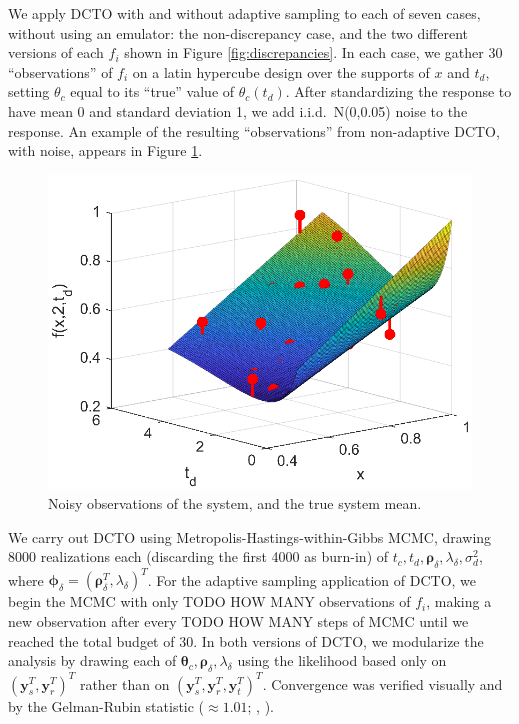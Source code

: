 \documentclass[12pt]{article}
\begin{document}
%

%
We apply DCTO with and without adaptive sampling to each of seven cases, without using an emulator: the non-discrepancy case, and the two different versions of each $f_i$ shown in Figure \ref{fig:discrepancies}.
%
In each case, we gather 30 ``observations'' of $f_i$ on a latin hypercube design over the supports of $x$ and $t_d$, setting $\theta_c$ equal to its ``true'' value of $\theta_c(t_d)$.
%
After standardizing the response to have mean 0 and standard deviation 1, we add i.i.d.\ N(0,0.05) noise to the response.
%
An example of the resulting ``observations'' from non-adaptive DCTO, with noise, appears in Figure \ref{fig:observed_data}.
%
\begin{figure}
	\centering
	\includegraphics[scale=0.85]{FIG_observed_data}
	\captionsetup{width=.85\linewidth}
	\caption{Noisy observations of the system, and the true system mean.}
	\label{fig:observed_data}
\end{figure}
%
We carry out DCTO using Metropolis-Hastings-within-Gibbs MCMC, drawing 8000 realizations each (discarding the first 4000 as burn-in) of $t_c,t_d,\boldsymbol\rho_{\delta},\lambda_{\delta},\sigma^2_d$, where $\boldsymbol\phi_\delta = (\boldsymbol\rho_\delta^T,\lambda_\delta)^T$.
%
For the adaptive sampling application of DCTO, we begin the MCMC with only TODO HOW MANY observations of $f_i$, making a new observation after every TODO HOW MANY steps of MCMC until we reached the total budget of 30.
%
In both versions of DCTO, we modularize the analysis by drawing each of $\boldsymbol\theta_c,\boldsymbol\rho_\delta,\lambda_\delta$ using the likelihood based only on $(\mathbf y_s^T,\mathbf y_r^T)^T$ rather than on $(\mathbf y_s^T,\mathbf y_r^T,\mathbf y_t^T)^T$.
%
Convergence was verified visually and by the Gelman-Rubin statistic ($\approx 1.01$; \citeauthor{Gelman1992a}, \citeyear{Gelman1992a}).
%
\end{document}
